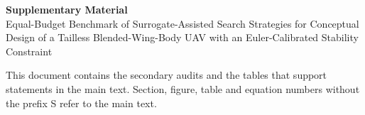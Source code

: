 \documentclass[11pt]{article}
\begin{document}
\begin{center}
{\Large\bfseries Supplementary Material}\\[6pt]
{\large Equal-Budget Benchmark of Surrogate-Assisted Search Strategies for Conceptual Design of a Tailless Blended-Wing-Body UAV with an Euler-Calibrated Stability Constraint}
\end{center}
\noindent This document contains the secondary audits and the tables that support statements in the main text. Section, figure, table and equation numbers without the prefix S refer to the main text.





\end{document}
